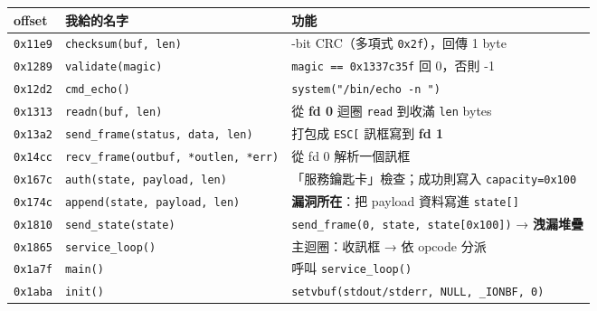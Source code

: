 \documentclass[10pt,a4paper]{article}
\newcounter{none}
\begin{document}
{\def\LTcaptype{none} %
\begin{longtable}[]{@{}
  >{\raggedright\arraybackslash}p{}
  >{\raggedright\arraybackslash}p{}
  >{\raggedright\arraybackslash}p{}@{}}
\toprule\noalign{}
\begin{minipage}[b]{\linewidth}\raggedright
offset
\end{minipage} & \begin{minipage}[b]{\linewidth}\raggedright
我給的名字
\end{minipage} & \begin{minipage}[b]{\linewidth}\raggedright
功能
\end{minipage} \\
\midrule\noalign{}
\endhead
\bottomrule\noalign{}
\endlastfoot
\texttt{0x11e9} & \texttt{checksum(buf,\allowbreak{}\ \allowbreak{}len)} & 8-bit CRC（多項式
\texttt{0x2f}），回傳 1 byte \\
\texttt{0x1289} & \texttt{validate(magic)} &
\texttt{magic\ \allowbreak{}==\ \allowbreak{}0x1337c35f} 回 0，否則 -1 \\
\texttt{0x12d2} & \texttt{cmd\_\allowbreak{}echo()} &
\texttt{system("/\allowbreak{}bin/\allowbreak{}echo\ \allowbreak{}-\allowbreak{}n\ \allowbreak{}\textquotesingle{}\allowbreak{}\textquotesingle{}\allowbreak{}")} \\
\texttt{0x1313} & \texttt{readn(buf,\allowbreak{}\ \allowbreak{}len)} & 從 \textbf{fd 0} 迴圈
\texttt{read} 到收滿 \texttt{len} bytes \\
\texttt{0x13a2} & \texttt{send\_\allowbreak{}frame(status,\allowbreak{}\ \allowbreak{}data,\allowbreak{}\ \allowbreak{}len)} & 打包成
\texttt{ESC{[}} 訊框寫到 \textbf{fd 1} \\
\texttt{0x14cc} & \texttt{recv\_\allowbreak{}frame(outbuf,\allowbreak{}\ \allowbreak{}*outlen,\allowbreak{}\ \allowbreak{}*err)} & 從 fd
0 解析一個訊框 \\
\texttt{0x167c} & \texttt{auth(state,\allowbreak{}\ \allowbreak{}payload,\allowbreak{}\ \allowbreak{}len)} &
「服務鑰匙卡」檢查；成功則寫入 \texttt{capacity=0x100} \\
\texttt{0x174c} & \texttt{append(state,\allowbreak{}\ \allowbreak{}payload,\allowbreak{}\ \allowbreak{}len)} &
\textbf{漏洞所在}：把 payload 資料寫進 \texttt{state{[}{]}} \\
\texttt{0x1810} & \texttt{send\_\allowbreak{}state(state)} &
\texttt{send\_\allowbreak{}frame(0,\allowbreak{}\ \allowbreak{}state,\allowbreak{}\ \allowbreak{}state{[}0x100{]})} →
\textbf{洩漏堆疊} \\
\texttt{0x1865} & \texttt{service\_\allowbreak{}loop()} & 主迴圈：收訊框 → 依 opcode
分派 \\
\texttt{0x1a7f} & \texttt{main()} & 呼叫 \texttt{service\_\allowbreak{}loop()} \\
\texttt{0x1aba} & \texttt{init()} &
\texttt{setvbuf(stdout/\allowbreak{}stderr,\allowbreak{}\ \allowbreak{}NULL,\allowbreak{}\ \allowbreak{}\_\allowbreak{}IONBF,\allowbreak{}\ \allowbreak{}0)} \\
\end{longtable}
}
\end{document}
